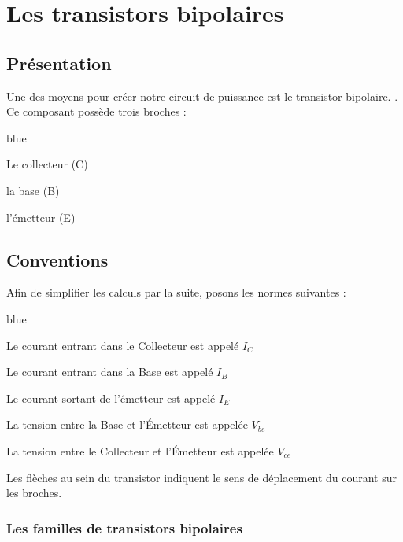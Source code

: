 \chapter{Les transistors bipolaires}

\section{Présentation}

Une des moyens pour créer notre circuit de puissance est le transistor bipolaire. . Ce composant possède trois broches : 

\begin{items}{blue}{\Triangle}

  \item Le collecteur (C)
  \item la base (B)
  \item l'émetteur (E)

\end{items}


\section{Conventions}

Afin de simplifier les calculs par la suite, posons les normes suivantes : 

\begin{items}{blue}{\Triangle}

  \item Le courant entrant dans le Collecteur est appelé $I_{C}$
  \item Le courant entrant dans la Base est appelé $I_{B}$
  \item Le courant sortant de l'émetteur est appelé $I_{E}$

  \item La tension entre la Base et l’Émetteur est appelée $V_{be}$
  \item La tension entre le Collecteur et l’Émetteur est appelée $V_{ce}$
\end{items}



Les flèches au sein du transistor indiquent le sens de déplacement du courant sur les broches.

\subsection{Les familles de transistors bipolaires}

